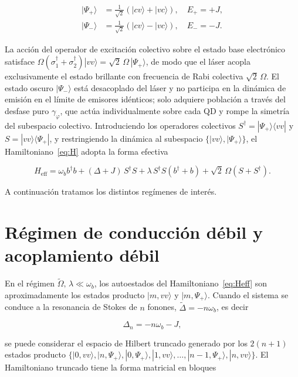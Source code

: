 \begin{align}
	|\Psi_+\rangle &= \tfrac{1}{\sqrt{2}}\!\left(|cv\rangle + |vc\rangle\right),
	\quad E_+ = +J,
	\label{eq:bright}\\[4pt]
	|\Psi_-\rangle &= \tfrac{1}{\sqrt{2}}\!\left(|cv\rangle - |vc\rangle\right),
	\quad E_- = -J.
	\label{eq:dark}
\end{align}

La acción del operador de excitación colectivo sobre el estado base electrónico satisface $\Omega(\sigma_1^\dagger+\sigma_2^\dagger)|vv\rangle = \sqrt{2}\,\Omega\,|\Psi_+\rangle$, de modo que el láser acopla exclusivamente el estado brillante con frecuencia de Rabi colectiva $\sqrt{2}\,\Omega$. El estado oscuro $|\Psi_-\rangle$ está desacoplado del láser y no participa en la dinámica de emisión en el límite de emisores idénticos; solo adquiere población a través del desfase puro $\gamma_\varphi$, que actúa individualmente sobre cada QD y rompe la simetría del subespacio colectivo. Introduciendo los operadores colectivos $S^\dagger = |\Psi_+\rangle\langle vv|$ y $S = |vv\rangle\langle\Psi_+|$, y restringiendo la dinámica al subespacio $\{|vv\rangle, |\Psi_+\rangle\}$, el Hamiltoniano~\eqref{eq:H} adopta la forma efectiva

\begin{equation}
	H_\mathrm{eff} = \omega_b b^\dagger b
	+ (\Delta + J)\,S^\dagger S
	+ \lambda\,S^\dagger S(b^\dagger + b)
	+ \sqrt{2}\,\Omega\!\left(S + S^\dagger\right).
	\label{eq:Heff}
\end{equation}

A continuación tratamos los distintos regímenes de interés.

\section{Régimen de conducción débil y acoplamiento débil}\label{reg1}

En el régimen $\widetilde\Omega,\,\lambda \ll \omega_b$, los autoestados del Hamiltoniano~\eqref{eq:Heff} son aproximadamente los estados producto $|m,vv\rangle$ y $|m,\Psi_+\rangle$. Cuando el sistema se conduce a la resonancia de Stokes de $n$ fonones, $\widetilde\Delta = -n\omega_b$, es decir

\begin{equation}
	\Delta_n = -n\omega_b - J,
	\label{eq:res}
\end{equation}

se puede considerar el espacio de Hilbert truncado generado por los $2(n+1)$ estados producto $\{|0,vv\rangle, |n,\Psi_+\rangle, |0,\Psi_+\rangle, |1,vv\rangle, \ldots, |n-1,\Psi_+\rangle, |n,vv\rangle\}$. El Hamiltoniano truncado tiene la forma matricial en bloques

